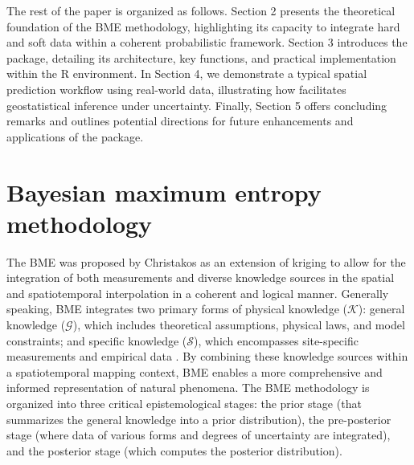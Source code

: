 The rest of the paper is organized as follows. Section 2 presents the theoretical foundation of the BME methodology, highlighting its capacity to integrate hard and soft data within a coherent probabilistic framework. Section 3 introduces the  package, detailing its architecture, key functions, and practical implementation within the R environment. In Section 4, we demonstrate a typical spatial prediction workflow using real-world data, illustrating how  facilitates geostatistical inference under uncertainty. Finally, Section 5 offers concluding remarks and outlines potential directions for future enhancements and applications of the package.

\section{Bayesian maximum entropy methodology}\label{bayesian-maximum-entropy-methodology}

The BME was proposed by Christakos \citep{christakos1990bayesian, christakos2000bme, becker2021using} as an extension of kriging to allow for the integration of both measurements and diverse knowledge sources in the spatial and spatiotemporal interpolation in a coherent and logical manner. Generally speaking, BME integrates two primary forms of physical knowledge (\(\mathcal{K}\)): general knowledge (\(\mathcal{G}\)), which includes theoretical assumptions, physical laws, and model constraints; and specific knowledge (\(\mathcal{S}\)), which encompasses site-specific measurements and empirical data \citep{serre1999modern, fu2020mitigating, yecsilkoy2020estimation}. By combining these knowledge sources within a spatiotemporal mapping context, BME enables a more comprehensive and informed representation of natural phenomena. The BME methodology is organized into three critical epistemological stages: the prior stage (that summarizes the general knowledge into a prior distribution), the pre-posterior stage (where data of various forms and degrees of uncertainty are integrated), and the posterior stage (which computes the posterior distribution).

